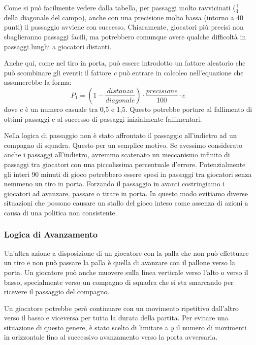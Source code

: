 \documentclass[aps,letterpaper,10pt]{article}
\begin{document}
Come si pu\`o facilmente vedere dalla tabella, per passaggi molto ravvicinati ($\frac{1}{4}$ della diagonale del campo),
anche con una precisione molto bassa (intorno a 40 punti) il passaggio avviene con successo. Chiaramente, giocatori
pi\`u precisi non sbaglieranno passaggi facili, ma potrebbero comunque avere qualche difficolt\`a in passaggi lunghi a
giocatori distanti. \vspace{3mm}

Anche qui, come nel tiro in porta, pu\`o essere introdotto un fattore aleatorio che pu\`o scombinare gli eventi: il
fattore \emph{c} pu\`o entrare in calcoleo nell'equazione che assumerebbe la forma: $$ P_1 = \left( 1 -
\frac{distanza}{diagonale} \right) \cdot \frac{precisione}{100} \cdot c $$ dove c \`e un numero casuale tra 0,5 e 1,5.
Questo potrebbe portare al fallimento di ottimi passaggi e al successo di passaggi inizialmente fallimentari.
\vspace{3mm}

Nella logica di passaggio non \`e stato affrontato il passaggio all'indietro ad un compagno di squadra. Questo per un
semplice motivo. Se avessimo considerato anche i passaggi all'indietro, avremmo scatenato un meccanismo infinito di
passaggi tra giocatori con una piccolissima percentuale d'errore. Potenzialmente gli interi 90 minuti di gioco
potrebbero essere spesi in passaggi tra giocatori senza nemmeno un tiro in porta. Forzando il passaggio in avanti
costringiamo i giocatori ad avanzare, passare o tirare in porta. In questo modo evitiamo diverse situazioni che possono
causare un stallo del gioco inteso come assenza di azioni a causa di una politica non consistente. \vspace{3mm}

\subsubsection{Logica di Avanzamento}
\label{avanzamento}

Un'altra azione a disposizione di un giocatore con la palla che non pu\`o effettuare un tiro e non pu\`o passare la
palla \`e quella di avanzare con il pallone verso la porta. Un giocatore pu\`o anche muovere sulla linea verticale verso
l'alto o verso il basso, specialmente verso un compagno di squadra che si sta smarcando per ricevere il passaggio del
compagno. \vspace{3mm}

Un giocatore potrebbe per\`o continuare con un movimento ripetitivo dall'altro verso il basso e viceversa per tutta la
durata della partita. Per evitare una situazione di questo genere, \`e stato scelto di limitare a \emph{y} il numero di
movimenti in orizzontale fino al successivo avanzamento verso la porta avversaria. \vspace{3mm}
\end{document}
